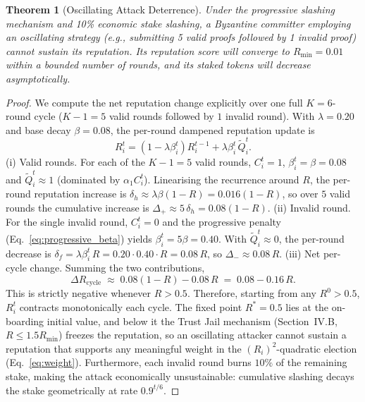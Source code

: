 \documentclass[journal]{IEEEtran}
\newtheorem{theorem}{Theorem}
\begin{document}
\begin{theorem}[Oscillating Attack Deterrence]
\label{thm:oscillating}
Under the progressive slashing mechanism and 10\% economic stake slashing, a Byzantine committer employing an oscillating strategy (e.g., submitting 5 valid proofs followed by 1 invalid proof) cannot sustain its reputation. Its reputation score will converge to $R_{\min} = 0.01$ within a bounded number of rounds, and its staked tokens will decrease asymptotically.
\end{theorem}

\begin{proof}
We compute the net reputation change explicitly over one full $K=6$-round cycle ($K-1=5$ valid rounds followed by $1$ invalid round). With $\lambda=0.20$ and base decay $\beta=0.08$, the per-round dampened reputation update is
\[
R_i^{t} = (1-\lambda\beta_i^{t})R_i^{t-1} + \lambda\beta_i^{t}\,\widetilde{Q}_i^{t}.
\]
{(i) Valid rounds.} For each of the $K-1=5$ valid rounds, $C_i^{t}=1$, $\beta_i^{t}=\beta=0.08$ and $\widetilde{Q}_i^{t}\approx 1$ (dominated by $\alpha_1 C_i^{t}$). Linearising the recurrence around $R$, the per-round reputation increase is $\delta_h \approx \lambda\beta(1-R)=0.016(1-R)$, so over $5$ valid rounds the cumulative increase is $\Delta_+ \approx 5\,\delta_h = 0.08(1-R)$.
{(ii) Invalid round.} For the single invalid round, $C_i^{t}=0$ and the progressive penalty (Eq.~\ref{eq:progressive_beta}) yields $\beta_i^{t}=5\beta=0.40$. With $\widetilde{Q}_i^{t}\approx 0$, the per-round decrease is $\delta_f = \lambda\beta_i^{t}\,R = 0.20\cdot 0.40\cdot R = 0.08\,R$, so $\Delta_- \approx 0.08\,R$.
{(iii) Net per-cycle change.} Summing the two contributions,
\[
\Delta R_{\text{cycle}} \;\approx\; 0.08(1-R) - 0.08\,R \;=\; 0.08 - 0.16\,R.
\]
This is strictly negative whenever $R > 0.5$. Therefore, starting from any $R^{0}>0.5$, $R_i^{t}$ contracts monotonically each cycle. The fixed point $R^{*}=0.5$ lies at the on-boarding initial value, and below it the Trust Jail mechanism (Section~IV.B, $R\le 1.5R_{\min}$) freezes the reputation, so an oscillating attacker cannot sustain a reputation that supports any meaningful weight in the $(R_i)^{2}$-quadratic election (Eq.~\ref{eq:weight}). Furthermore, each invalid round burns $10\%$ of the remaining stake, making the attack economically unsustainable: cumulative slashing decays the stake geometrically at rate $0.9^{t/6}$.
\end{proof}
\end{document}

